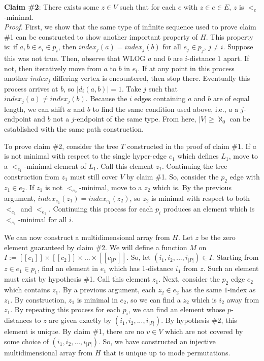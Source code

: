 \documentclass{article}
\theoremstyle{plain}
\theoremstyle{definition}
\theoremstyle{remark}
\begin{document}
	\textbf{Claim \#2}: There exists some $z \in V$ such that for each $e$ with $z \in e \in E$, $z$ is $<_e$-minimal.\\
	\textit{Proof.} First, we show that the same type of infinite sequence used to prove claim \#1 can be constructed to show another important property of $H$. This property is: if $a, b \in e_i \in p_i$, then $index_j(a) = index_j(b)$ for all $e_j \in p_j$, $j \neq i$. Suppose this was not true. Then, observe that WLOG $a$ and $b$ are $i$-distance $1$ apart. If not, then iteratively move from $a$ to $b$ in $e_i$. If at any point in this process another $index_j$ differing vertex is encountered, then stop there. Eventually this process arrives at $b$, so $|d_i(a, b)| = 1$. Take $j$ such that $index_j(a) \neq index_j(b)$. Because the $i$ edges containing $a$ and $b$ are of equal length, we can shift $a$ and $b$ to find the same condition used above, i.e., $a$ a $j$-endpoint and $b$ not a $j$-endpoint of the same type. From here, $|V| \geq \aleph_0$ can be established with the same path construction.
	
	To prove claim \#2, consider the tree $T$ constructed in the proof of claim \#1. If $a$ is not minimal with respect to the single hyper-edge $e_1$ which defines $L_1$, move to a $<_{e_1}$-minimal element of $L_1$. Call this element $z_1$. Continuing the tree construction from $z_1$ must still cover $V$ by claim \#1. So, consider the $p_2$ edge with $z_1 \in e_2$. If $z_1$ is not $<_{e_2}$-minimal, move to a $z_2$ which is. By the previous argument, $index_{e_1}(z_1) = index_{e_1}(z_2)$, so $z_2$ is minimal with respect to both $<_{e_1}$ and $<_{e_1}$. Continuing this process for each $p_i$ produces an element which is $<_{e_1}$-minimal for all $i$.
	
	We can now construct a multidimensional array from $H$. Let $z$ be the zero element guaranteed by claim \#2. We will define a function $M$ on $I := [[c_1]] \times [[c_2]] \times ... \times [[c_{|P|}]]$. So, let $(i_1, i_2, ..., i_{|P|}) \in I$. Starting from $z \in e_1 \in p_1$, find an element in $e_1$ which has $1$-distance $i_1$ from $z$. Such an element must exist by hypothesis \#1. Call this element $z_1$. Next, consider the $p_2$ edge $e_2$ which contains $z_1$. By a previous argument, each $z_2 \in e_2$ has the same $1$-index as $z_1$. By construction, $z_1$ is minimal in $e_2$, so we can find a $z_2$ which is $i_2$ away from $z_1$. By repeating this process for each $p_i$, we can find an element whose $p$-distances to $z$ are given exactly by $(i_1, i_2, ..., i_{|P|})$. By hypothesis \#2, this element is unique. By claim \#1, there are no $v \in V$ which are not covered by some choice of $(i_1, i_2, ..., i_{|P|})$. So, we have constructed an injective multidimensional array from $H$ that is unique up to mode permutations.
	
\end{document}
